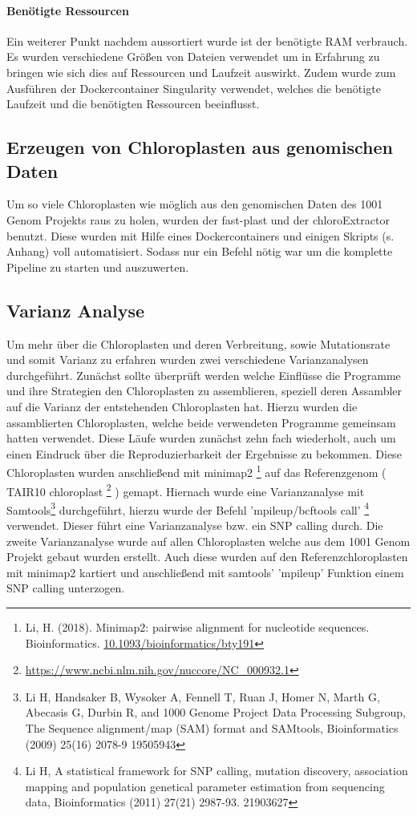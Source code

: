 \documentclass{scrartcl}
\begin{document}
\paragraph{Benötigte Ressourcen}
\label{sec-3-1-2-4}
Ein weiterer Punkt nachdem aussortiert wurde ist der benötigte RAM verbrauch. Es wurden verschiedene Größen von Dateien verwendet
um in Erfahrung zu bringen wie sich dies auf Ressourcen und Laufzeit auswirkt. Zudem wurde zum Ausführen der Dockercontainer 
Singularity \footnotemark[43]{} verwendet, welches die benötigte Laufzeit und die benötigten Ressourcen beeinflusst.


\subsection{Erzeugen von Chloroplasten aus genomischen Daten}
\label{sec-3-2}
Um so viele Chloroplasten wie möglich aus den genomischen Daten des 1001 Genom Projekts raus zu holen, wurden der fast-plast und der chloroExtractor benutzt.
Diese wurden mit Hilfe eines Dockercontainers und einigen Skripts (s. Anhang) voll automatisiert. Sodass nur ein Befehl nötig war um die komplette 
Pipeline zu starten und auszuwerten. 

\subsection{Varianz Analyse}
\label{sec-3-3}
Um mehr über die Chloroplasten und deren Verbreitung, sowie Mutationsrate und somit Varianz zu erfahren wurden zwei verschiedene Varianzanalysen durchgeführt. 
Zunächst sollte überprüft werden welche Einflüsse die Programme und ihre Strategien den Chloroplasten zu assemblieren, speziell deren Assambler auf die Varianz der 
entstehenden Chloroplasten hat. Hierzu wurden die assamblierten Chloroplasten, welche beide verwendeten Programme gemeinsam hatten verwendet. Diese Läufe wurden zunächst
zehn fach wiederholt, auch um einen Eindruck über die Reproduzierbarkeit der Ergebnisse zu bekommen. Diese Chloroplasten wurden anschließend mit minimap2 \footnote{Li, H. (2018). Minimap2: pairwise alignment for nucleotide sequences. Bioinformatics. \url{10.1093/bioinformatics/bty191}} auf das 
Referenzgenom ( TAIR10 chloroplast \footnote{\url{https://www.ncbi.nlm.nih.gov/nuccore/NC_000932.1}} ) gemapt. Hiernach wurde eine Varianzanalyse mit Samtools\footnote{Li H, Handsaker B, Wysoker A, Fennell T, Ruan J, Homer N, Marth G, Abecasis G, Durbin R, and 1000 Genome Project Data Processing Subgroup, The Sequence alignment/map (SAM) format and SAMtools, Bioinformatics (2009) 25(16) 2078-9 19505943} durchgeführt, hierzu wurde der Befehl
'mpileup/bcftools call' \footnote{Li H, A statistical framework for SNP calling, mutation discovery, association mapping and population genetical parameter estimation from sequencing data, Bioinformatics (2011) 27(21) 2987-93. 21903627} verwendet. Dieser führt eine Varianzanalyse bzw. ein SNP calling durch. Die zweite Varianzanalyse wurde auf allen Chloroplasten welche aus dem
1001 Genom Projekt gebaut wurden erstellt. Auch diese wurden auf den Referenzchloroplasten mit minimap2 kartiert und anschließend mit samtools' 'mpileup' Funktion einem
SNP calling unterzogen. 
\end{document}
